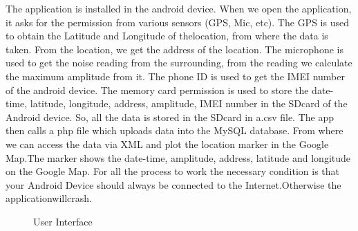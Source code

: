 The application is installed in the android device. When we open the application, it asks for the permission from various sensors (GPS, Mic, etc). 
The GPS is used to obtain the Latitude and Longitude of thelocation, from where the data is taken. From the location, we get the address of the location.  
The microphone is used to get the noise reading from the surrounding, from the reading we calculate the maximum amplitude from it.
The phone ID is used to get the IMEI number of the android device. 
The memory card permission is used to store the date-time, latitude, longitude, address, amplitude, IMEI number in the SDcard of the Android device.
So, all the data is stored in the SDcard in a.csv file. The app then calls a php file which uploads data into the MySQL database.
From where we can access the data via XML and plot the location marker in the Google Map.The marker shows the date-time, amplitude, address, latitude and longitude on the Google Map.
For all the process to work the necessary condition is that your Android Device should always be connected to the Internet.Otherwise the applicationwillcrash.



\begin{figure}
	\hfill
	\hfill
	\hfill
	\caption{User Interface}
\end{figure}

